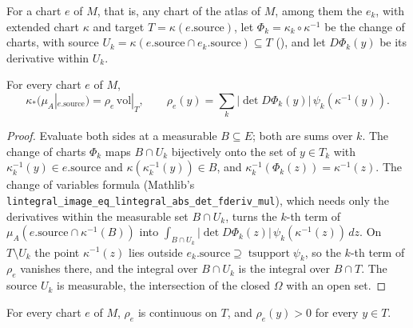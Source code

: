 For a chart $e$ of $M$, that is, any chart of the atlas of $M$, among them the $e_k$, with
extended chart $\kappa$ and target $T = \kappa(e.\mathrm{source})$, let
$\Phi_k = \kappa_k \circ \kappa^{-1}$ be the change of charts, with source
$U_k = \kappa(e.\mathrm{source} \cap e_k.\mathrm{source}) \subseteq T$ (),
and let $D\Phi_k(y)$ be its derivative within $U_k$.

\begin{lemma}
\label{lem:chart-measure-density}
\leanok
{}
For every chart $e$ of $M$,
\[
  \kappa_* (\mu_A|_{e.\mathrm{source}}) = \rho_e \, \mathrm{vol}|_T , \qquad
  \rho_e(y) = \sum_k |\det D\Phi_k(y)| \, \psi_k(\kappa^{-1}(y)) .
\]
\end{lemma}

\begin{proof}
\leanok
Evaluate both sides at a measurable $B \subseteq E$; both are sums over $k$. The change of charts
$\Phi_k$ maps $B \cap U_k$ bijectively onto the set of $y \in T_k$ with
$\kappa_k^{-1}(y) \in e.\mathrm{source}$ and $\kappa(\kappa_k^{-1}(y)) \in B$, and
$\kappa_k^{-1}(\Phi_k(z)) = \kappa^{-1}(z)$. The change of variables formula (Mathlib's
\texttt{lintegral\_image\_eq\_\allowbreak lintegral\_abs\_\allowbreak det\_fderiv\_mul}), which
needs only the derivatives within the measurable set $B \cap U_k$, turns the $k$-th term of
$\mu_A(e.\mathrm{source} \cap \kappa^{-1}(B))$ into
$\int_{B \cap U_k} |\det D\Phi_k(z)| \, \psi_k(\kappa^{-1}(z)) \, dz$. On $T \setminus U_k$ the
point $\kappa^{-1}(z)$ lies outside $e_k.\mathrm{source} \supseteq \operatorname{tsupport}
\psi_k$, so the $k$-th term of $\rho_e$ vanishes there, and the integral over $B \cap U_k$ is the
integral over $B \cap T$. The source $U_k$ is measurable, the intersection of the closed $\Omega$
with an open set.
\end{proof}

\begin{lemma}
\label{lem:chart-density-positive}
\leanok
{}
For every chart $e$ of $M$, $\rho_e$ is continuous on $T$, and $\rho_e(y) > 0$ for every
$y \in T$.
\end{lemma}

